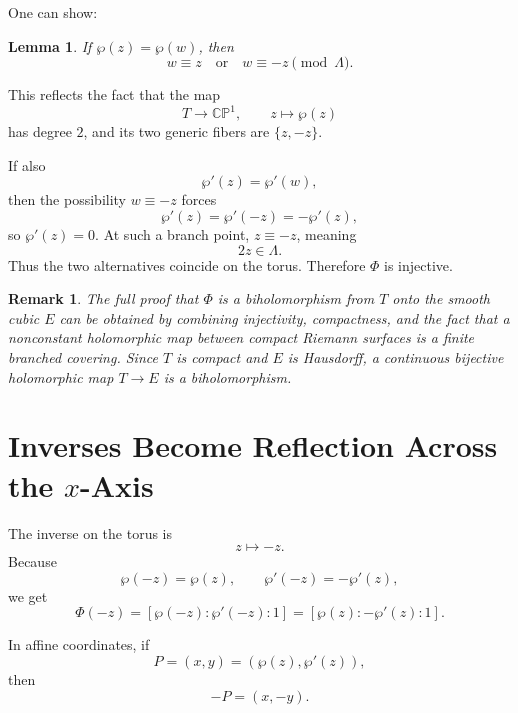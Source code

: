 \documentclass[11pt]{article}
\newcommand{\CP}{\mathbb{CP}}
\newtheorem*{lemma}{Lemma}
\newtheorem*{remark}{Remark}
\begin{document}
One can show:

\begin{lemma}
If \(\wp(z)=\wp(w)\), then
\[
w\equiv z
\quad\text{or}\quad
w\equiv -z
\pmod{\Lambda}.
\]
\end{lemma}

This reflects the fact that the map
\[
T\to\CP^1,\qquad z\mapsto\wp(z)
\]
has degree \(2\), and its two generic fibers are \(\{z,-z\}\).

If also
\[
\wp'(z)=\wp'(w),
\]
then the possibility \(w\equiv -z\) forces
\[
\wp'(z)=\wp'(-z)=-\wp'(z),
\]
so \(\wp'(z)=0\).  At such a branch point, \(z\equiv -z\), meaning
\[
2z\in\Lambda.
\]
Thus the two alternatives coincide on the torus.  Therefore \(\Phi\) is
injective.

\begin{remark}
The full proof that \(\Phi\) is a biholomorphism from \(T\) onto the smooth
cubic \(E\) can be obtained by combining injectivity, compactness, and the
fact that a nonconstant holomorphic map between compact Riemann surfaces is
a finite branched covering.  Since \(T\) is compact and \(E\) is Hausdorff,
a continuous bijective holomorphic map \(T\to E\) is a biholomorphism.
\end{remark}

\section{\texorpdfstring{Inverses Become Reflection Across the \(x\)-Axis}{Inverses Become Reflection Across the x-Axis}}

The inverse on the torus is
\[
z\mapsto -z.
\]
Because
\[
\wp(-z)=\wp(z),
\qquad
\wp'(-z)=-\wp'(z),
\]
we get
\[
\Phi(-z)
=
[\wp(-z):\wp'(-z):1]
=
[\wp(z):-\wp'(z):1].
\]

In affine coordinates, if
\[
P=(x,y)=(\wp(z),\wp'(z)),
\]
then
\[
-P=(x,-y).
\]

\begin{center}
\end{center}
\end{document}
